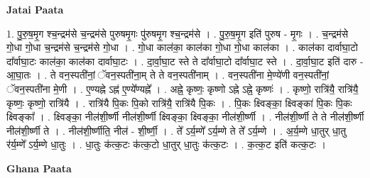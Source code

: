 \documentclass[17pt]{extarticle}
\begin{document}
\textbf{Jatai Paata} \newline

1. पु॒रु॒ष॒मृ॒ग श्च॒न्द्रम॑से च॒न्द्रम॑से पुरुषमृ॒गः पु॑रुषमृ॒ग श्च॒न्द्रम॑से । . पु॒रु॒ष॒मृ॒ग इति॑ पुरुष - मृ॒गः । . च॒न्द्रम॑से गो॒धा गो॒धा च॒न्द्रम॑से च॒न्द्रम॑से गो॒धा । . गो॒धा काल॑का॒ काल॑का गो॒धा गो॒धा काल॑का । . काल॑का दार्वाघा॒टो दा᳚र्वाघा॒टः काल॑का॒ काल॑का दार्वाघा॒टः । . दा॒र्वा॒घा॒ट स्ते ते दा᳚र्वाघा॒टो दा᳚र्वाघा॒ट स्ते । . दा॒र्वा॒घा॒ट इति॑ दारु - आ॒घा॒तः । . ते वन॒स्पती॑नां॒ ॅवन॒स्पती॑ना॒म् ते ते वन॒स्पती॑नाम् । . वन॒स्पती॑ना मे॒ण्ये॑णी वन॒स्पती॑नां॒ ॅवन॒स्पती॑ना मे॒णी । . ए॒ण्यह्ने ऽह्न॑ ए॒ण्ये᳚ण्यह्ने᳚ । . अह्ने॒ कृष्णः॒ कृष्णो ऽह्ने ऽह्ने॒ कृष्णः॑ । . कृष्णो॒ रात्रि॑यै॒ रात्रि॑यै॒ कृष्णः॒ कृष्णो॒ रात्रि॑यै । . रात्रि॑यै पि॒कः पि॒को रात्रि॑यै॒ रात्रि॑यै पि॒कः । . पि॒कः क्ष्विङ्का॒ क्ष्विङ्का॑ पि॒कः पि॒कः क्ष्विङ्का᳚ । . क्ष्विङ्का॒ नील॑शी॒र्ष्णी नील॑शी॒र्ष्णी क्ष्विङ्का॒ क्ष्विङ्का॒ नील॑शी॒र्ष्णी । . नील॑शी॒र्ष्णी ते ते नील॑शी॒र्ष्णी नील॑शी॒र्ष्णी ते । . नील॑शी॒र्ष्णीति॒ नील॑ - शी॒र्ष्णी॒ । . ते᳚ ऽर्य॒म्णे᳚ ऽर्य॒म्णे ते ते᳚ ऽर्य॒म्णे । . अ॒र्य॒म्णे धा॒तुर् धा॒तु र॑र्य॒म्णे᳚ ऽर्य॒म्णे धा॒तुः । . धा॒तुः क॑त्क॒टः क॑त्क॒टो धा॒तुर् धा॒तुः क॑त्क॒टः । . क॒त्क॒ट इति॑ कत्क॒टः । \newline

\textbf{Ghana Paata } \newline
\end{document}
